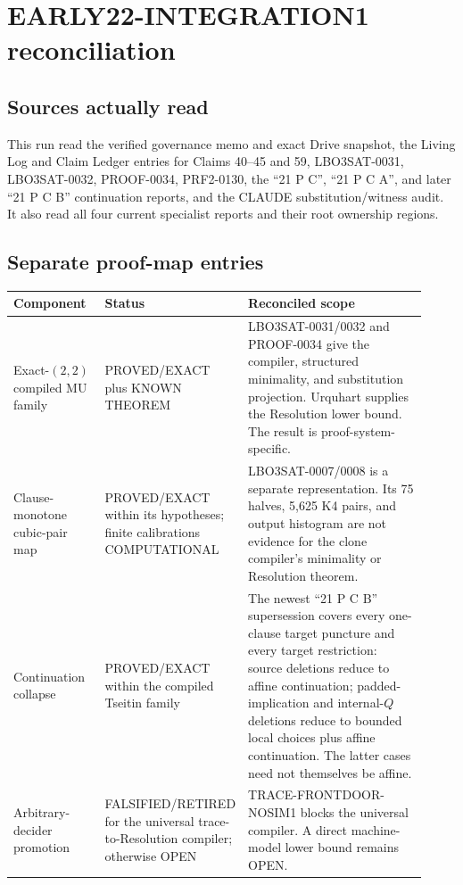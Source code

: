 \documentclass[11pt]{article}
\begin{document}
\section{EARLY22-INTEGRATION1 reconciliation}

\subsection*{Sources actually read}

This run read the verified governance memo and exact Drive snapshot, the
Living Log and Claim Ledger entries for Claims 40--45 and 59, LBO3SAT-0031,
LBO3SAT-0032, PROOF-0034, PRF2-0130, the ``21 P C'', ``21 P C A'', and later
``21 P C B'' continuation reports, and the CLAUDE substitution/witness audit.
It also read all four current specialist reports and their root ownership
regions.

\subsection*{Separate proof-map entries}

\begin{longtable}{p{0.23\linewidth}p{0.14\linewidth}p{0.55\linewidth}}
\toprule
Component & Status & Reconciled scope\\
\midrule
\endhead
Exact-$(2,2)$ compiled MU family & PROVED/EXACT plus KNOWN THEOREM &
LBO3SAT-0031/0032 and PROOF-0034 give the compiler, structured minimality,
and substitution projection.  Urquhart supplies the Resolution lower bound.
The result is proof-system-specific.\\
Clause-monotone cubic-pair map & PROVED/EXACT within its hypotheses; finite
calibrations COMPUTATIONAL & LBO3SAT-0007/0008 is a separate representation.
Its 75 halves, 5,625 K4 pairs, and output histogram are not evidence for the
clone compiler's minimality or Resolution theorem.\\
Continuation collapse & PROVED/EXACT within the compiled Tseitin family &
The newest ``21 P C B'' supersession covers every one-clause target puncture
and every target restriction: source deletions reduce to affine continuation;
padded-implication and internal-$Q$ deletions reduce to bounded local choices
plus affine continuation.  The latter cases need not themselves be affine.\\
Arbitrary-decider promotion & FALSIFIED/RETIRED for the universal
trace-to-Resolution compiler; otherwise OPEN & TRACE-FRONTDOOR-NOSIM1 blocks
the universal compiler.  A direct machine-model lower bound remains OPEN.\\
\bottomrule
\end{longtable}
\end{document}
